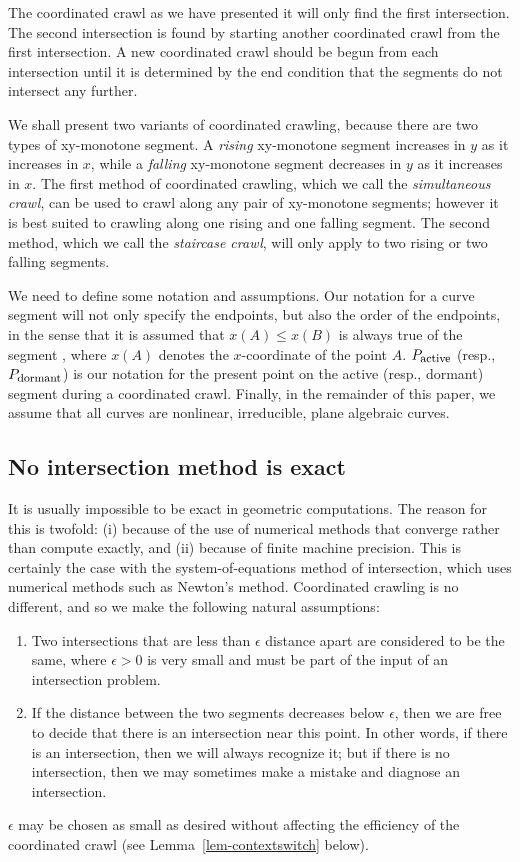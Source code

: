 The coordinated crawl as we have presented it will only find the first intersection.
The second intersection is found by starting another coordinated crawl from the
first intersection.
A new coordinated crawl should be begun from each intersection 
until it is determined by the end condition that the segments do not intersect any further.

We shall present two variants of coordinated crawling, because there are two types
of xy-monotone segment.
A {\em rising} xy-monotone segment increases in $y$ as it increases in $x$, while
a {\em falling} xy-monotone segment decreases in $y$ as it increases in $x$.
The first method of coordinated crawling, which we call the {\em simultaneous crawl}, 
can be used to 
crawl along any pair of xy-monotone segments;
however it is best suited to crawling along one rising and one falling segment.
The second method, which we call the {\em staircase crawl}, will 
only apply to two rising or two falling 
segments.

We need to define some notation and assumptions.
Our notation for a curve segment will not only specify the endpoints,
but also the order of the endpoints, in the sense that it is assumed that
$x(A) \leq x(B)$ is always true of the segment , where
$x(A)$ denotes the $x$-coordinate of the point $A$.
$P_{\mbox{\footnotesize{active}}}$ (resp., $P_{\mbox{\footnotesize{dormant}}}$)
is our notation for the present point on the active (resp., dormant) segment during 
a coordinated crawl. 
Finally, in the remainder of this paper, we assume that all curves are nonlinear, 
irreducible, plane algebraic curves.

\subsection{No intersection method is exact}
\label{sub-exact}

It is usually impossible to be exact in geometric computations.
The reason for this is twofold: (i)
because of the use of numerical methods that converge rather
than compute exactly, and (ii) because of finite machine precision.
This is certainly the case with the system-of-equations method of intersection, 
which uses numerical methods such as Newton's method.
Coordinated crawling is no different, and so we make the following natural assumptions:
\begin{enumerate}
\item
	Two intersections that are less than $\epsilon$ distance apart are considered 
	to be the same, where $\epsilon > 0$ is very small and must be part of the input 
	of an intersection problem.
\item
	If the distance between the two segments decreases below $\epsilon$, 
	then we are free to decide that there is an intersection near this point.
        In other words, if there is an intersection, then we will always recognize it;
\label{ass2}
	but if there is no intersection, then we may sometimes make a mistake and 
	diagnose an intersection.
\end{enumerate}
$\epsilon$ may be chosen as small as desired without affecting the efficiency of the 
coordinated crawl (see Lemma~\ref{lem-contextswitch} below).

